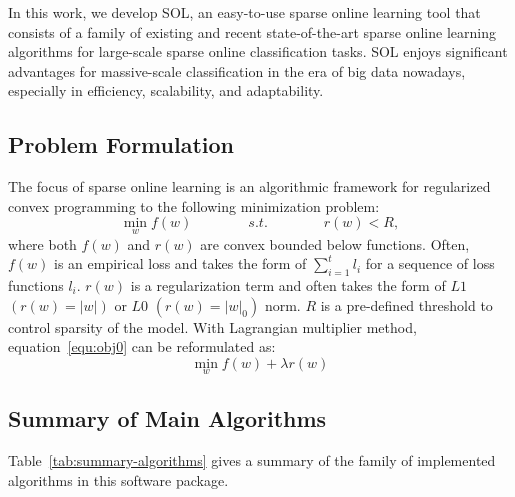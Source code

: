 \documentclass[11pt,a4paper]{article}
\begin{document}
In this work, we develop \textsf{SOL}, an easy-to-use sparse online learning
tool that consists of a family of existing and recent state-of-the-art sparse
online learning algorithms for large-scale sparse online classification tasks.
SOL enjoys significant advantages for massive-scale classification in the era of big data nowadays, especially in efficiency,  scalability, and adaptability. 


\subsection{Problem Formulation}
The focus of sparse online learning is an algorithmic framework for regularized
convex programming to the following minimization problem:
\begin{equation}
    \min_{w}{f(w)} \qquad \qquad s.t. \qquad \qquad r(w) < R,
    \label{equ:obj0}
\end{equation}
where both $f(w)$ and $r(w)$ are convex bounded below functions. Often, $f(w)$
is an empirical loss and takes the form of $\sum_{i=1}^t{l_i}$ for a sequence
of loss functions $l_i$. $r(w)$ is a regularization term and often takes the
form of $\textit{L1}$ $(r(w) = |w|)$ or $\textit{L0}$ $(r(w) = |w|_0)$ norm.
$R$ is a pre-defined threshold to control sparsity of the model. With
Lagrangian multiplier method, equation~\eqref{equ:obj0} can be reformulated as:
\begin{equation}
    \min_{w}{f(w) + \lambda r(w)}
    \label{equ:obj}
\end{equation}

\subsection{Summary of Main Algorithms}
Table~\ref{tab:summary-algorithms} gives a summary of the family of implemented algorithms in this software package. 
\end{document}
